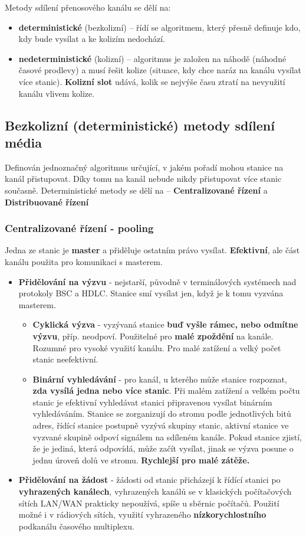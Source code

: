 Metody sdílení přenosového kanálu se dělí na:
\begin{itemize}
	\item \textbf{deterministické} (bezkolizní) -- řídí se algoritmem, který přesně definuje kdo, kdy bude vysílat a ke kolizím nedochází.
	\item \textbf{nedeterministické} (kolizní) -- algoritmus je založen na náhodě (náhodné časové prodlevy) a musí řešit kolize (situace, kdy chce naráz na kanálu vysílat více stanic). \textbf{Kolizní slot} udává, kolik se nejvýše času ztratí na nevyužití kanálu vlivem kolize.
\end{itemize}

\subsection{Bezkolizní (deterministické) metody sdílení média}
Definován jednoznačný algoritmus určující, v jakém pořadí mohou stanice na kanál přistupovat. Díky tomu na kanál nebude nikdy přistupovat více stanic současně. Deterministické metody se dělí na -- \textbf{Centralizované řízení} a \textbf{Distribuované řízení}

\subsubsection{Centralizované řízení - pooling}
Jedna ze stanic je \textbf{master} a přiděluje ostatním právo vysílat. \textbf{Efektivní}, ale část kanálu použita pro komunikaci s masterem.
\begin{itemize}
	\item \textbf{Přidělování na výzvu} - nejstarší, původně v terminálových systémech nad protokoly BSC a HDLC. Stanice smí vysílat jen, když je k tomu vyzvána masterem.
	\begin{itemize}
	\item \textbf{Cyklická výzva} - vyzývaná stanice \textbf{buď vyšle rámec, nebo odmítne výzvu}, příp. neodpoví. Použitelné pro \textbf{malé zpoždění} na kanále. Rozumné pro vysoké využití kanálu. Pro malé zatížení a velký počet stanic neefektivní.
	\item \textbf{Binární vyhledávání} - pro kanál, u kterého může stanice rozpoznat,\textbf{ zda vysílá jedna nebo více stanic}. Při malém zatížení a velkém počtu stanic je efektivní vyhledávat stanici připravenou vysílat binárním vyhledáváním. Stanice se zorganizují do stromu podle jednotlivých bitů adres, řídící stanice postupně vyzývá skupiny stanic, aktivní stanice ve vyzvané skupině odpoví signálem na sdíleném kanále. Pokud stanice zjistí, že je jediná, která odpovídá, může začít vysílat, jinak se výzva posune o jednu úroveň dolů ve stromu. \textbf{Rychlejší pro malé zátěže.}
\end{itemize}
	\item \textbf{Přidělování na žádost} - žádosti od stanic přicházejí k řídící stanici po \textbf{vyhrazených kanálech}, vyhrazených kanálů se v klasických počítačových sítích LAN/WAN prakticky nepoužívá, spíše u sběrnic počítačů. Použití možné i v rádiových sítích, využití vyhrazeného \textbf{nízkorychlostního} podkanálu časového multiplexu.
\end{itemize}

